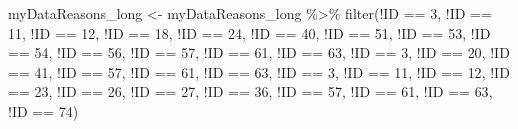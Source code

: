 \documentclass[
]{article}
\newenvironment{Shaded}{\begin{snugshade}}{\end{snugshade}}
\newcommand{\DecValTok}[1]{\textcolor[rgb]{0.00,0.00,0.81}{#1}}
\newcommand{\FunctionTok}[1]{\textcolor[rgb]{0.00,0.00,0.00}{#1}}
\newcommand{\NormalTok}[1]{#1}
\newcommand{\OtherTok}[1]{\textcolor[rgb]{0.56,0.35,0.01}{#1}}
\newcommand{\SpecialCharTok}[1]{\textcolor[rgb]{0.00,0.00,0.00}{#1}}
\begin{document}
\begin{Shaded}
\begin{Highlighting}[]
\NormalTok{myDataReasons\_long }\OtherTok{\textless{}{-}}\NormalTok{ myDataReasons\_long }\SpecialCharTok{\%\textgreater{}\%}
  \FunctionTok{filter}\NormalTok{(}\SpecialCharTok{!}\NormalTok{ID }\SpecialCharTok{==} \DecValTok{3}\NormalTok{, }\SpecialCharTok{!}\NormalTok{ID }\SpecialCharTok{==} \DecValTok{11}\NormalTok{, }\SpecialCharTok{!}\NormalTok{ID }\SpecialCharTok{==} \DecValTok{12}\NormalTok{, }\SpecialCharTok{!}\NormalTok{ID }\SpecialCharTok{==} \DecValTok{18}\NormalTok{, }\SpecialCharTok{!}\NormalTok{ID }\SpecialCharTok{==} \DecValTok{24}\NormalTok{, }\SpecialCharTok{!}\NormalTok{ID }\SpecialCharTok{==} \DecValTok{40}\NormalTok{, }\SpecialCharTok{!}\NormalTok{ID }\SpecialCharTok{==} \DecValTok{51}\NormalTok{, }\SpecialCharTok{!}\NormalTok{ID }\SpecialCharTok{==} \DecValTok{53}\NormalTok{, }\SpecialCharTok{!}\NormalTok{ID }\SpecialCharTok{==} \DecValTok{54}\NormalTok{, }\SpecialCharTok{!}\NormalTok{ID }\SpecialCharTok{==} \DecValTok{56}\NormalTok{, }\SpecialCharTok{!}\NormalTok{ID }\SpecialCharTok{==} \DecValTok{57}\NormalTok{, }\SpecialCharTok{!}\NormalTok{ID }\SpecialCharTok{==} \DecValTok{61}\NormalTok{, }\SpecialCharTok{!}\NormalTok{ID }\SpecialCharTok{==} \DecValTok{63}\NormalTok{, }\SpecialCharTok{!}\NormalTok{ID }\SpecialCharTok{==} \DecValTok{3}\NormalTok{, }\SpecialCharTok{!}\NormalTok{ID }\SpecialCharTok{==} \DecValTok{20}\NormalTok{, }\SpecialCharTok{!}\NormalTok{ID }\SpecialCharTok{==} \DecValTok{41}\NormalTok{, }\SpecialCharTok{!}\NormalTok{ID }\SpecialCharTok{==} \DecValTok{57}\NormalTok{, }\SpecialCharTok{!}\NormalTok{ID }\SpecialCharTok{==} \DecValTok{61}\NormalTok{, }\SpecialCharTok{!}\NormalTok{ID }\SpecialCharTok{==} \DecValTok{63}\NormalTok{, }\SpecialCharTok{!}\NormalTok{ID }\SpecialCharTok{==} \DecValTok{3}\NormalTok{, }\SpecialCharTok{!}\NormalTok{ID }\SpecialCharTok{==} \DecValTok{11}\NormalTok{, }\SpecialCharTok{!}\NormalTok{ID }\SpecialCharTok{==} \DecValTok{12}\NormalTok{, }\SpecialCharTok{!}\NormalTok{ID }\SpecialCharTok{==} \DecValTok{23}\NormalTok{, }\SpecialCharTok{!}\NormalTok{ID }\SpecialCharTok{==} \DecValTok{26}\NormalTok{, }\SpecialCharTok{!}\NormalTok{ID }\SpecialCharTok{==} \DecValTok{27}\NormalTok{, }\SpecialCharTok{!}\NormalTok{ID }\SpecialCharTok{==} \DecValTok{36}\NormalTok{, }\SpecialCharTok{!}\NormalTok{ID }\SpecialCharTok{==} \DecValTok{57}\NormalTok{, }\SpecialCharTok{!}\NormalTok{ID }\SpecialCharTok{==} \DecValTok{61}\NormalTok{, }\SpecialCharTok{!}\NormalTok{ID }\SpecialCharTok{==} \DecValTok{63}\NormalTok{, }\SpecialCharTok{!}\NormalTok{ID }\SpecialCharTok{==} \DecValTok{74}\NormalTok{)}
\end{Highlighting}
\end{Shaded}
\end{document}
